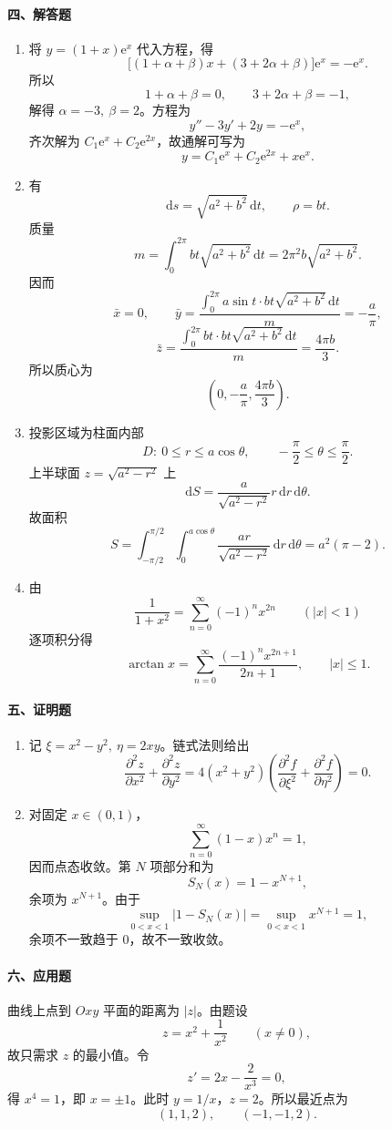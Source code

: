 \paragraph*{四、解答题}
\begin{enumerate}
  \item 将 \(y=(1+x)\mathrm{e}^x\) 代入方程，得
  \[
    \bigl[(1+\alpha+\beta)x+(3+2\alpha+\beta)\bigr]\mathrm{e}^x=-\mathrm{e}^x.
  \]
  所以
  \[
    1+\alpha+\beta=0,\qquad 3+2\alpha+\beta=-1,
  \]
  解得 \(\alpha=-3,\ \beta=2\)。方程为
  \[
    y''-3y'+2y=-\mathrm{e}^x,
  \]
  齐次解为 \(C_1\mathrm{e}^x+C_2\mathrm{e}^{2x}\)，故通解可写为
  \[
    y=C_1\mathrm{e}^x+C_2\mathrm{e}^{2x}+x\mathrm{e}^x.
  \]

  \item 有
  \[
    \mathrm{d}s=\sqrt{a^2+b^2}\,\mathrm{d}t,\qquad \rho=bt.
  \]
  质量
  \[
    m=\int_0^{2\pi}bt\sqrt{a^2+b^2}\,\mathrm{d}t
    =2\pi^2b\sqrt{a^2+b^2}.
  \]
  因而
  \[
    \bar x=0,\qquad
    \bar y=\frac{\int_0^{2\pi}a\sin t\cdot bt\sqrt{a^2+b^2}\,\mathrm{d}t}{m}
    =-\frac a\pi,
  \]
  \[
    \bar z=\frac{\int_0^{2\pi}bt\cdot bt\sqrt{a^2+b^2}\,\mathrm{d}t}{m}
    =\frac{4\pi b}{3}.
  \]
  所以质心为
  \[
    \left(0,-\frac a\pi,\frac{4\pi b}{3}\right).
  \]

  \item 投影区域为柱面内部
  \[
    D:\ 0\le r\le a\cos\theta,\qquad -\frac{\pi}{2}\le\theta\le\frac{\pi}{2}.
  \]
  上半球面 \(z=\sqrt{a^2-r^2}\) 上
  \[
    \mathrm{d}S=\frac{a}{\sqrt{a^2-r^2}}r\,\mathrm{d}r\,\mathrm{d}\theta.
  \]
  故面积
  \[
    S=\int_{-\pi/2}^{\pi/2}\int_0^{a\cos\theta}
    \frac{ar}{\sqrt{a^2-r^2}}\,\mathrm{d}r\,\mathrm{d}\theta
    =a^2(\pi-2).
  \]

  \item 由
  \[
    \frac1{1+x^2}=\sum_{n=0}^{\infty}(-1)^n x^{2n}\qquad (|x|<1)
  \]
  逐项积分得
  \[
    \arctan x=\sum_{n=0}^{\infty}\frac{(-1)^n x^{2n+1}}{2n+1},
    \qquad |x|\le 1.
  \]
\end{enumerate}

\paragraph*{五、证明题}
\begin{enumerate}
  \item 记 \(\xi=x^2-y^2,\ \eta=2xy\)。链式法则给出
  \[
    \frac{\partial^2z}{\partial x^2}+\frac{\partial^2z}{\partial y^2}
    =4(x^2+y^2)\left(\frac{\partial^2f}{\partial \xi^2}+\frac{\partial^2f}{\partial \eta^2}\right)=0.
  \]

  \item 对固定 \(x\in(0,1)\)，
  \[
    \sum_{n=0}^{\infty}(1-x)x^n=1,
  \]
  因而点态收敛。第 \(N\) 项部分和为
  \[
    S_N(x)=1-x^{N+1},
  \]
  余项为 \(x^{N+1}\)。由于
  \[
    \sup_{0<x<1}|1-S_N(x)|=\sup_{0<x<1}x^{N+1}=1,
  \]
  余项不一致趋于 \(0\)，故不一致收敛。
\end{enumerate}

\paragraph*{六、应用题}
曲线上点到 \(Oxy\) 平面的距离为 \(|z|\)。由题设
\[
  z=x^2+\frac1{x^2}\qquad (x\ne0),
\]
故只需求 \(z\) 的最小值。令
\[
  z'=2x-\frac2{x^3}=0,
\]
得 \(x^4=1\)，即 \(x=\pm1\)。此时 \(y=1/x\)，\(z=2\)。所以最近点为
\[
  (1,1,2),\qquad (-1,-1,2).
\]
